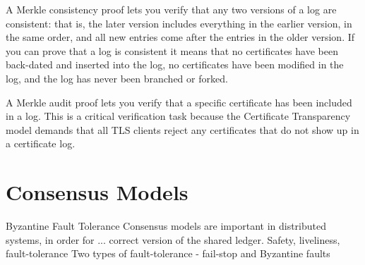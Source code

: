 
A Merkle consistency proof lets you verify that any two versions of a log are consistent: that is, the later version includes everything in the earlier version, in the same order, and all new entries come after the entries in the older version. If you can prove that a log is consistent it means that no certificates have been back-dated and inserted into the log, no certificates have been modified in the log, and the log has never been branched or forked.

A Merkle audit proof lets you verify that a specific certificate has been included in a log. This is a critical verification task because the Certificate Transparency model demands that all TLS clients reject any certificates that do not show up in a certificate log.

\section{Consensus Models}
Byzantine Fault Tolerance
Consensus models are important in distributed systems, in order for ... correct version of the shared ledger. 
Safety, liveliness, fault-tolerance
Two types of fault-tolerance - fail-stop and Byzantine faults 


